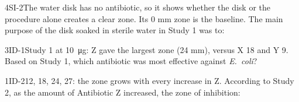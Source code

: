 \documentclass[11pt]{article}
\begin{document}
\begin{minipage}[t]{0.32\linewidth}
\end{minipage}\hfill
\begin{minipage}[t]{0.32\linewidth}
\end{minipage}\hfill
\begin{minipage}[t]{0.32\linewidth}
\end{minipage}
\passageend

\begin{q}{4}{SI-2}{The water disk has no antibiotic, so it shows whether the disk or the procedure alone creates a clear zone. Its 0 mm zone is the baseline.}
The main purpose of the disk soaked in sterile water in Study 1 was to:
\end{q}

\begin{q}{3}{ID-1}{Study 1 at \SI{10}{\micro\gram}: Z gave the largest zone (24 mm), versus X 18 and Y 9.}
Based on Study 1, which antibiotic was most effective against \textit{E.\ coli}?
\end{q}

\begin{q}{1}{ID-2}{12, 18, 24, 27: the zone grows with every increase in Z.}
According to Study 2, as the amount of Antibiotic Z increased, the zone of inhibition:
\end{q}
\end{document}
